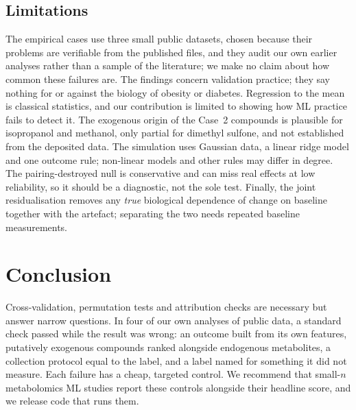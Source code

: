\documentclass[conference]{IEEEtran}
\begin{document}
\subsection{Limitations}
The empirical cases use three small public datasets, chosen because their
problems are verifiable from the published files, and they audit our own
earlier analyses rather than a sample of the literature; we make no claim
about how common these failures are. The findings concern validation
practice; they say nothing for or against the biology of obesity or diabetes.
Regression to the mean is classical statistics, and our contribution is
limited to showing how ML practice fails to detect it. The exogenous origin
of the Case~2 compounds is plausible for isopropanol and methanol, only
partial for dimethyl sulfone, and not established from the deposited data. The simulation uses Gaussian data, a linear ridge model and one outcome
rule; non-linear models and other rules may differ in degree. The
pairing-destroyed null is conservative and can miss real effects at low
reliability, so it should be a diagnostic, not the sole test. Finally, the
joint residualisation removes any \emph{true} biological dependence of change
on baseline together with the artefact; separating the two needs repeated
baseline measurements.

\section{Conclusion}
\label{sec:conclusion}
Cross-validation, permutation tests and attribution checks are necessary but
answer narrow questions. In four of our own analyses of public data, a
standard check passed while the result was wrong: an outcome built from its
own features, putatively exogenous compounds ranked alongside endogenous
metabolites, a collection protocol equal to the label, and a label named for
something it did not measure. Each failure has a cheap, targeted control. We
recommend that small-$n$ metabolomics ML studies report these controls
alongside their headline score, and we release code that runs them.

\end{document}
